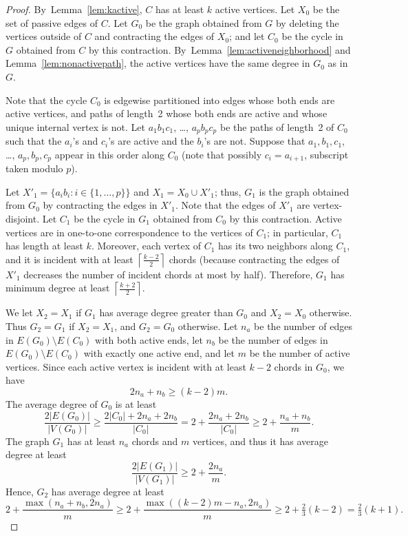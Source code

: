 \documentclass[11pt]{article}
\begin{document}
\begin{proof}
    By~Lemma~\ref{lem:kactive}, $C$ has at least $k$ active vertices. Let $X_0$ be the set of 
    passive edges of $C$.  Let $G_0$ be the graph obtained from $G$ by deleting the vertices outside of $C$
    and contracting the edges of $X_0$; and let $C_0$ be the cycle in $G$ obtained from $C$ by this contraction.
    By~Lemma~\ref{lem:activeneighborhood} and Lemma~\ref{lem:nonactivepath}, the active vertices have the same degree in $G_0$ as in $G$.

    Note that the cycle $C_0$ is edgewise partitioned into edges whose both ends are active vertices, and
    paths of length~2 whose both ends are active and whose unique internal
    vertex is not.  Let $a_1b_1c_1$, \dots, $a_pb_pc_p$ be the paths
    of length~2 of $C_0$ such that the $a_i$'s and $c_i$'s are active and the
    $b_i$'s are not.  Suppose that $a_1, b_1, c_1$, \dots, $a_p, b_p, c_p$
    appear in this order along $C_0$ (note that possibly $c_i=a_{i+1}$,
    subscript taken modulo $p$).

    Let $X'_1=\{a_ib_i:i\in \{1,\ldots,p\}\}$ and $X_1=X_0\cup X'_1$; thus, $G_1$ is the graph obtained from $G_0$ by contracting the edges in $X'_1$.
    Note that the edges of $X'_1$ are vertex-disjoint.   Let $C_1$ be the cycle in $G_1$ obtained from $C_0$ by this contraction.
    Active vertices are in one-to-one correspondence to the vertices of $C_1$; in particular, $C_1$ has length at least $k$.
    Moreover, each vertex of $C_1$ has its two neighbors along $C_1$, and it is incident with at least $\left\lceil \frac{k-2}{2}\right\rceil$
    chords (because contracting the edges of $X'_1$ decreases the number of incident chords
    at most by half).  Therefore, $G_1$ has minimum degree at least $\left\lceil \frac{k+2}{2}\right\rceil$.

    We let $X_2=X_1$ if $G_1$ has average degree greater than $G_0$ and $X_2=X_0$ otherwise.  Thus $G_2 = G_1$ if $X_2=X_1$, and $G_2 = G_0$ otherwise.   Let $n_a$ be the number of edges in $E(G_0)\setminus E(C_0)$
    with both active ends, let $n_b$ be the number of edges in $E(G_0)\setminus E(C_0)$ with exactly one active end, and let $m$ be the number of active vertices.
    Since each active vertex is incident with at least $k-2$ chords in $G_0$,
    we have
    $$2n_a+n_b\ge (k-2)m.$$
    The average degree of $G_0$ is at least
    $$\frac{2|E(G_0)|}{|V(G_0)|}\ge \frac{2|C_0|+2n_a+2n_b}{|C_0|}=2+\frac{2n_a+2n_b}{|C_0|}\ge 2+\frac{n_a+n_b}{m}.$$
    The graph $G_1$ has at least $n_a$ chords and $m$ vertices, and thus it has average degree at least
    $$\frac{2|E(G_1)|}{|V(G_1)|}\ge 2+\frac{2n_a}{m}.$$
    Hence, $G_2$ has average degree at least
    $$2+\frac{\max(n_a+n_b,2n_a)}{m}\ge 2+\frac{\max((k-2)m-n_a,2n_a)}{m}\ge 2+\tfrac{2}{3}(k-2)=\tfrac{2}{3}(k+1).$$
\end{proof}
\end{document}
